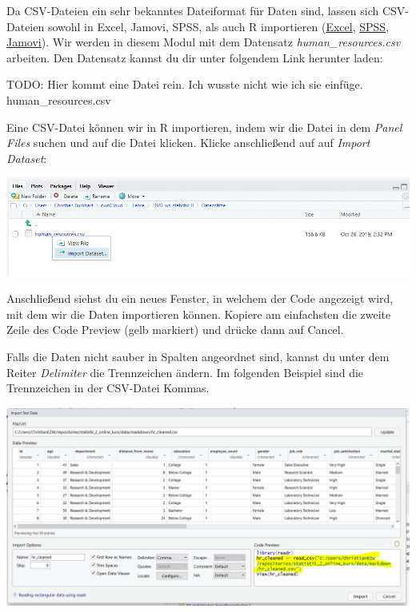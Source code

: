 \documentclass[
]{book}
\begin{document}
Da CSV-Dateien ein sehr bekanntes Dateiformat für Daten sind, lassen sich CSV-Dateien sowohl in Excel, Jamovi, SPSS, als auch R importieren (\href{https://support.microsoft.com/de-de/office/importieren-oder-exportieren-von-textdateien-txt-oder-csv-5250ac4c-663c-47ce-937b-339e391393ba?ui=de-de\&rs=de-de\&ad=de}{Excel}, \href{https://www.youtube.com/watch?v=-imCiECplPo}{SPSS}, \href{https://www.youtube.com/watch?v=R0uE4LlHeac}{Jamovi}). Wir werden in diesem Modul mit dem Datensatz \emph{human\_resources.csv} arbeiten. Den Datensatz kannst du dir unter folgendem Link herunter laden:

TODO: Hier kommt eine Datei rein. Ich wusste nicht wie ich sie einfüge. human\_resources.csv

Eine CSV-Datei können wir in R importieren, indem wir die Datei in dem \emph{Panel Files} suchen und auf die Datei klicken. Klicke anschließend auf auf \emph{Import Dataset}:

\includegraphics{images/02_grundlagen/csv_.png}

Anschließend siehst du ein neues Fenster, in welchem der Code angezeigt wird, mit dem wir die Daten importieren können. Kopiere am einfachsten die zweite Zeile des Code Preview (gelb markiert) und drücke dann auf Cancel.~

Falls die Daten nicht sauber in Spalten angeordnet sind, kannst du unter dem Reiter \emph{Delimiter} die Trennzeichen ändern. Im folgenden Beispiel sind die Trennzeichen in der CSV-Datei Kommas.

\includegraphics{images/02_grundlagen/table.jpg}
\end{document}
